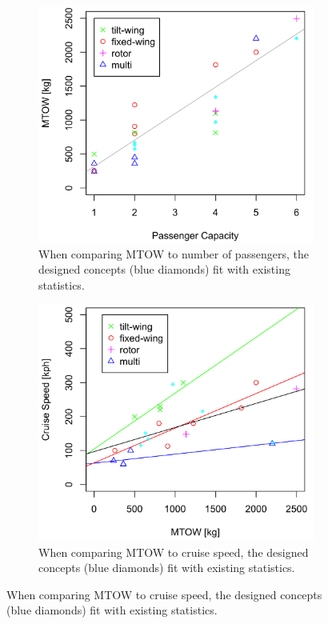 \begin{figure}[H]
\begin{subfigure}[t]{0.5\textwidth}
    \centering
    \includegraphics[width=\textwidth]{Figures/MTOW-Pax2.png}
    \captionsetup{width=.8\linewidth}
    \caption{When comparing MTOW to number of passengers, the designed concepts (blue diamonds) fit with existing statistics.}
    \label{fig:MTOW-Pax2}
\end{subfigure}
\begin{subfigure}[t]{0.5\textwidth}
    \centering
    \includegraphics[width=\textwidth]{Figures/Cruise-MTOW2.png}
    \captionsetup{width=.8\linewidth}
    \caption{When comparing MTOW to cruise speed, the designed concepts (blue diamonds) fit with existing statistics.}
    \label{fig:Cruise-MTOW2}
\end{subfigure}
\label{fig:concept_compare}
\end{figure}

